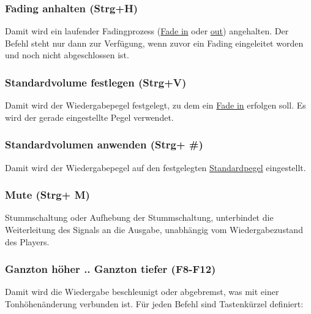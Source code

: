 \documentclass[a4paper,DIV=11
]{scrartcl}
\begin{document}
\hypertarget{fading-anhalten-strgh}{%
\subsubsection{Fading anhalten (Strg+H)}\label{fading-anhalten-strgh}}

Damit wird ein laufender Fadingprozess (\protect\hyperlink{FadeIn}{Fade
in} oder \protect\hyperlink{FadeOut}{out}) angehalten. Der Befehl steht
nur dann zur Verfügung, wenn zuvor ein Fading eingeleitet worden und
noch nicht abgeschlossen ist.

\hypertarget{standardvolume-festlegen-strgv}{%
\subsubsection{Standardvolume festlegen
(Strg+V)}\label{standardvolume-festlegen-strgv}}

Damit wird der Wiedergabepegel festgelegt, zu dem ein
\protect\hyperlink{FadeIn}{Fade in} erfolgen soll. Es wird der gerade
eingestellte Pegel verwendet.

\hypertarget{standardvolumen-anwenden-strg-}{%
\subsubsection{Standardvolumen anwenden (Strg+
\#)}\label{standardvolumen-anwenden-strg-}}

Damit wird der Wiedergabepegel auf den festgelegten
\protect\hyperlink{StandardvolumeFestlegen}{Standardpegel} eingestellt.

\hypertarget{mute-strg-m}{%
\subsubsection{Mute (Strg+ M)}\label{mute-strg-m}}

Stummschaltung oder Aufhebung der Stummschaltung, unterbindet die
Weiterleitung des Signals an die Ausgabe, unabhängig vom
Wiedergabezustand des Players.

\hypertarget{ganzton-huxf6her--ganzton-tiefer-f8-f12}{%
\subsubsection{Ganzton höher .. Ganzton tiefer
(F8-F12)}\label{ganzton-huxf6her--ganzton-tiefer-f8-f12}}

Damit wird die Wiedergabe beschleunigt oder abgebremst, was mit einer
Tonhöhenänderung verbunden ist.  Für jeden Befehl sind Tastenkürzel definiert:
\end{document}
